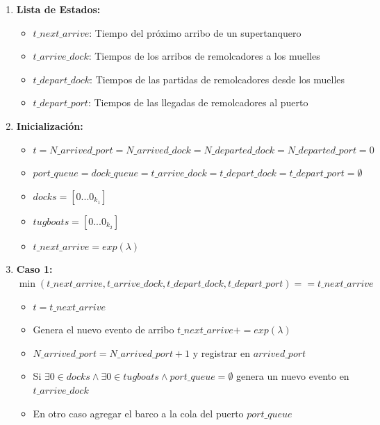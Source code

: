 \documentclass[titlepage,11pt]{scrartcl}
\begin{document}
\begin{enumerate}
        \item \textbf{Lista de Estados:}
			\begin{itemize}
                \item $t\_next\_arrive$: Tiempo del pr\'oximo arribo de un supertanquero
				\item $t\_arrive\_dock$: Tiempos de los arribos de remolcadores a los muelles
				\item $t\_depart\_dock$: Tiempos de las partidas de remolcadores desde los muelles
				\item $t\_depart\_port$: Tiempos de las llegadas de remolcadores al puerto
			\end{itemize}
        
        \item \textbf{Inicializaci\'on:}
			\begin{itemize}
                \item $t = N\_arrived\_port = N\_arrived\_dock = N\_departed\_dock = N\_departed\_port = 0$
				\item $port\_queue = dock\_queue = t\_arrive\_dock = t\_depart\_dock = t\_depart\_port  = \emptyset$
				\item $docks = [0...0_{k_1}]$
				\item $tugboats = [0...0_{k_2}]$
                \item $t\_next\_arrive = exp(\lambda)$
			\end{itemize}
        
        \item \textbf{Caso 1: $\min(t\_next\_arrive, t\_arrive\_dock, t\_depart\_dock, t\_depart\_port)  == t\_next\_arrive$}
			\begin{itemize}
                \item $t = t\_next\_arrive$ 
                \item Genera el nuevo evento de arribo $t\_next\_arrive += exp(\lambda)$
                \item $N\_arrived\_port = N\_arrived\_port + 1$ y registrar en $arrived\_port$
				\item Si $\exists 0 \in docks \land \exists 0 \in tugboats \land port\_queue = \emptyset$ genera un nuevo evento en $t\_arrive\_dock$
				\item En otro caso agregar el barco a la cola del puerto $port\_queue$ 
			\end{itemize}
        

\end{enumerate}
\end{document}
